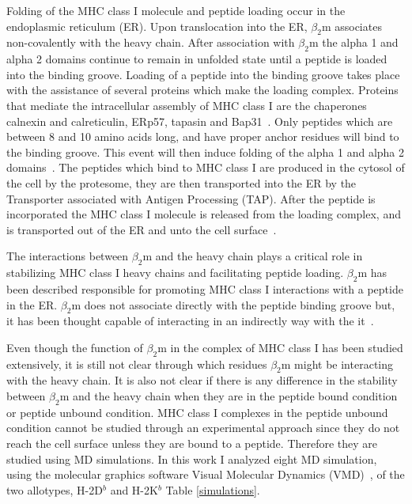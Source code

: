 \documentclass[11pt,twocolumn]{article}
\newcommand{\4}{four {\AA}ngstroms}
\begin{document}
Folding of the MHC class I molecule and peptide loading occur in the endoplasmic reticulum (ER). Upon translocation 
into the ER, $\beta_{2}$m associates non-covalently with the heavy chain. After association with $\beta_{2}$m the 
alpha 1 and alpha 2 domains continue to remain in unfolded state until a peptide is loaded into the binding groove. 
Loading of a peptide into the binding groove takes place with the assistance of several proteins which make the 
loading complex. Proteins that mediate the intracellular assembly of MHC class I are the chaperones calnexin and 
calreticulin, ERp57, tapasin and Bap31~\cite{zhang2006assembly}. Only peptides which are between 8 and 10 amino acids 
long, and have proper anchor residues will bind to the binding groove. This event will then induce folding of the 
alpha 1 and alpha 2 domains~\cite{simone2012analysis}. The peptides which bind to MHC class I are produced in the 
cytosol of the cell by the protesome, they are then transported into the ER by the Transporter associated with 
Antigen Processing (TAP). After the peptide is incorporated the MHC class I molecule is released from the loading 
complex, and is transported out of the ER and unto the cell surface~\cite{lundegaard2012predictions}.


The interactions between $\beta_{2}$m and the heavy chain plays a critical role in stabilizing MHC class I heavy chains and facilitating 
peptide loading. $\beta_{2}$m has been described responsible for promoting MHC class I interactions with a peptide in the ER.
$\beta_{2}$m does not associate directly with the peptide binding groove but, it has been thought capable of interacting in an indirectly way with the it~\cite{smith1993alteration}.

Even though the function of $\beta_{2}$m in the complex of MHC class I has been studied extensively, it is still not clear through which 
residues  $\beta_{2}$m might be interacting with the heavy chain. It is also not clear if there is any difference in the stability between $\beta_{2}$m and the heavy chain when they are in the peptide bound condition or peptide unbound condition. MHC class I complexes in the peptide unbound condition cannot be studied through an experimental approach since they do not reach the cell surface unless they are bound to a peptide. Therefore they are studied 
using MD simulations. In this work I analyzed eight MD simulation, using the molecular graphics software Visual Molecular Dynamics (VMD)~\cite{vmd96}, of the two allotypes, H-2D$^{b}$ and H-2K$^{b}$ Table \ref{simulations}. 
\end{document}
